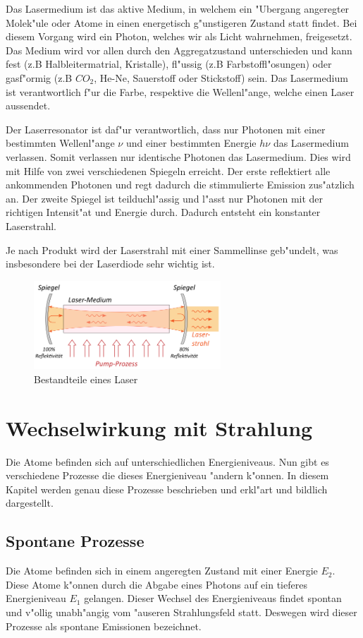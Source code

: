 \begin{refsection}
Das Lasermedium ist das aktive Medium, in welchem ein "Ubergang angeregter 
Molek"ule oder Atome in einen energetisch g"unstigeren Zustand statt findet. 
Bei diesem Vorgang wird ein Photon, welches wir als Licht wahrnehmen, 
freigesetzt. Das Medium wird vor allen durch den Aggregatzustand 
unterschieden und kann fest (z.B Halbleitermatrial, Kristalle), fl"ussig (z.B 
Farbstoffl"osungen) oder gasf"ormig (z.B $CO_{2}$, He-Ne, Sauerstoff oder 
Stickstoff) sein. Das Lasermedium ist verantwortlich f"ur die Farbe, 
respektive die Wellenl"ange, welche einen Laser aussendet.

Der Laserresonator ist daf"ur verantwortlich, dass nur Photonen mit 
einer bestimmten Wellenl"ange $\nu$ und einer bestimmten Energie $h\nu$ 
das Lasermedium verlassen. Somit verlassen nur identische Photonen das 
Lasermedium. Dies wird mit Hilfe von zwei verschiedenen Spiegeln 
erreicht. Der erste reflektiert alle ankommenden Photonen und regt 
dadurch die stimmulierte Emission zus"atzlich an. Der zweite Spiegel ist 
teilduchl"assig und l"asst nur Photonen mit der richtigen Intensit"at 
und Energie durch. Dadurch entsteht ein konstanter Laserstrahl.

Je nach Produkt wird der Laserstrahl mit einer Sammellinse geb"undelt, 
was insbesondere bei der Laserdiode sehr wichtig ist.

\begin{figure}
\center
\includegraphics[width=7cm]{laser/bilder/aufbau.png}
\caption{Bestandteile eines Laser \cite{Aufbau}}
\label{Laser Aufbau}
\end{figure}


\section{Wechselwirkung mit Strahlung}
\label{Wechselwirkung}
Die Atome befinden sich auf unterschiedlichen Energieniveaus. 
Nun gibt es verschiedene Prozesse die dieses Energieniveau "andern k"onnen.
In diesem Kapitel werden genau diese Prozesse beschrieben und erkl"art und
bildlich dargestellt.


\subsection{Spontane Prozesse}
\label{Spontane Prozesse}
Die Atome befinden sich in einem angeregten Zustand mit einer Energie $E_2$. 
Diese Atome k"onnen durch die Abgabe eines Photons auf ein tieferes
Energieniveau $E_1$ gelangen.
Dieser Wechsel des Energieniveaus findet spontan und v"ollig unabh"angig vom
"auseren Strahlungsfeld statt.
Deswegen wird dieser Prozesse als spontane Emissionen bezeichnet.


\end{refsection}
